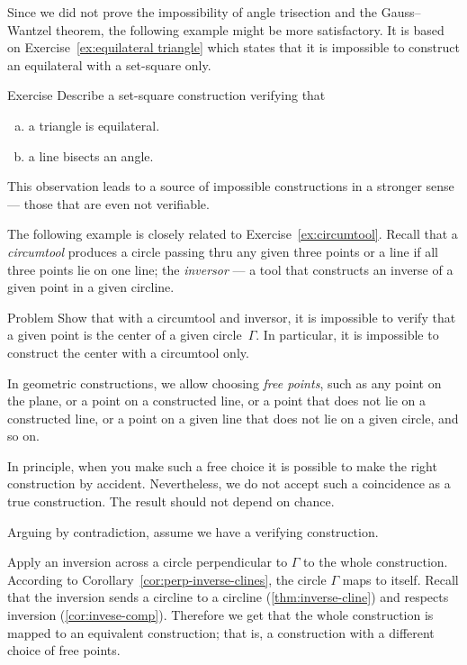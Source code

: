 Since we did not prove the impossibility of angle trisection and the Gauss--Wantzel theorem, the following example might be more satisfactory.
It is based on Exercise~\ref{ex:equilateral triangle} which states that it is impossible to construct an equilateral with a set-square only.

\begin{thm}{Exercise}\label{ex:equilateral triangle-verify}
Describe a set-square construction verifying that 
\begin{enumerate}[(a)]
\item\label{ex:verify:triangle} a triangle is equilateral.
\item\label{ex:verify:bisector} a line bisects an angle.
\end{enumerate}
\end{thm}

This observation leads to a source of impossible constructions in a stronger sense --- those that are even not verifiable.

The following example is closely related to Exercise~\ref{ex:circumtool}.
Recall that a \emph{circumtool} produces a circle passing thru any given three points
or a line if all three points lie on one line;
the \emph{inversor} --- a tool that constructs an inverse of a given point in a given circline.


\begin{thm}{Problem}\label{prob:center-inversor+circumtool}
Show that with a circumtool and inversor,
it is impossible to verify that a given point is the center of a given circle~$\Gamma$.
In particular, it is impossible to construct the center with a circumtool only.
\end{thm}

In geometric constructions, we allow choosing \emph{free points}, such as any point on the plane, or a point on a constructed line, or a point that does not lie on a constructed line, or a point on a given line that does not lie on a given circle, and so on.

In principle, when you make such a free choice it is possible to make the right construction by accident.
Nevertheless, we do not accept such a coincidence as a true construction.
The result should not depend on chance.


\label{page:solution-for-ex:circumtool}
Arguing by contradiction, 
assume we have a verifying construction. 

Apply an inversion across a circle perpendicular to $\Gamma$ to the whole construction.
According to Corollary~\ref{cor:perp-inverse-clines},
the circle
$\Gamma$ maps to itself.
Recall that the inversion sends a circline to a circline (\ref{thm:inverse-cline}) and respects inversion (\ref{cor:invese-comp}).
Therefore we get that the whole  construction is mapped to an equivalent construction; 
that is, a construction with a different choice of free points.

